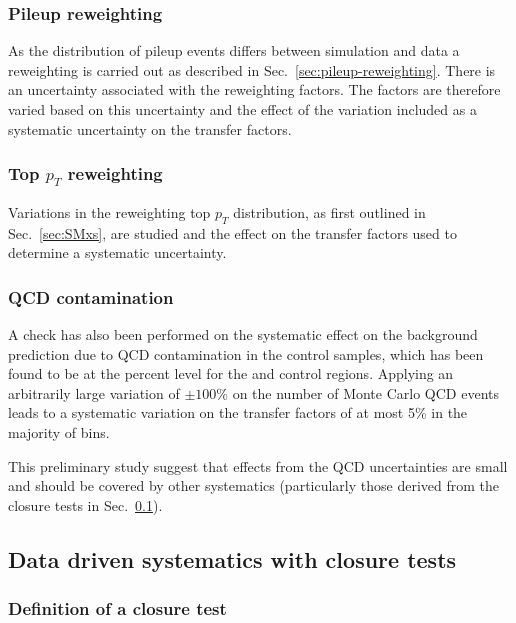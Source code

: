\subsubsection{Pileup reweighting}

As the distribution of pileup events differs between simulation and
data a reweighting is carried out as described in
Sec.~\ref{sec:pileup-reweighting}. There is an uncertainty associated
with the reweighting factors. The factors are therefore varied based
on this uncertainty and the effect of the variation included as a
systematic uncertainty on the transfer factors.

\subsubsection{Top $p_T$ reweighting}

Variations in the reweighting top $p_{T}$ distribution, as first outlined in 
Sec.~\ref{sec:SMxs}, are studied and the effect on the transfer
factors used to determine a systematic uncertainty.

\subsubsection{QCD contamination}

A check has also been performed on the systematic effect on the
background prediction due to QCD contamination in the control samples,
which has been found to be at the percent level for the \mj and \gj
control regions. Applying an arbitrarily large variation of $\pm
100\%$ on the number of Monte Carlo QCD events leads to a systematic
variation on the transfer factors of at most 5\% in the majority of
bins.

This preliminary study suggest that effects from the QCD
uncertainties are small and should be covered by other systematics
(particularly those derived from the closure tests in
Sec.~\ref{sec:closure-tests}).



\subsection{Data driven systematics with closure tests}
\label{sec:closure-tests}

\subsubsection{Definition of a closure test}
\label{sec:closure-tests-desc}


